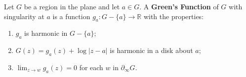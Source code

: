 Let $G$ be a region in the plane and let $a \in G$. A \textbf{Green's Function} of $G$ with singularity at $a$ is a function $g_a: G - \{a\} \to \mathbb{R}$ with the properties:
\begin{enumerate}
\item[(a)] $g_a$ is harmonic in $G - \{a\}$;
\item[(b)] $G(z) = g_a(z) + \log |z-a|$ is harmonic in a disk about $a$;
\item[(c)] $\displaystyle\lim_{z \to w} g_a(z) = 0$ for each $w$ in $\partial_\infty G$.
\end{enumerate}
